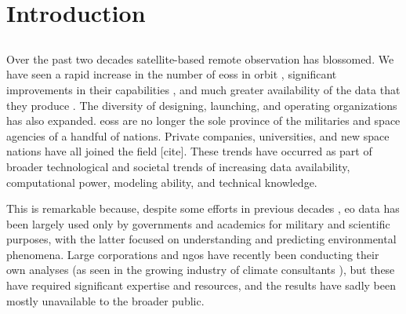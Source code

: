 \chapter{Introduction} \label{ch:intro}

\section{} \label{sec:questions}

Over the past two decades satellite-based remote observation has blossomed. We have seen a rapid increase in the number of \acp{eos} in orbit \cite{belwardWhoLaunchedWhat2015}, significant improvements in their capabilities \cite{jensenRemoteSensingEnvironment2006}, and much greater availability of the data that they produce \cite{borowitzOpenSpaceGlobal2017}. The diversity of designing, launching, and operating organizations has also expanded. \acp{eos} are no longer the sole province of the militaries and space agencies of a handful of nations. Private companies, universities, and new space nations have all joined the field [cite]. These trends have occurred as part of broader technological and societal trends of increasing data availability, computational power, modeling ability, and technical knowledge. 

This is remarkable because, despite some efforts in previous decades \cite{lightWarfareWelfareDefense2005}, \ac{eo} data has been largely used only by governments and academics for military and scientific purposes, with the latter focused on understanding and predicting environmental phenomena. Large corporations and \acp{ngo} have recently been conducting their own analyses (as seen in the growing industry of climate consultants \cite{cohenTop10Climate2011}), but these have required significant expertise and resources, and the results have sadly been mostly unavailable to the broader public.

